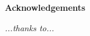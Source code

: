 \thispagestyle{empty}

\begin{center}
  {\bf \Huge Acknowledgements}
\end{center}

\vspace{4cm}


\emph{
  ...thanks to...
}
